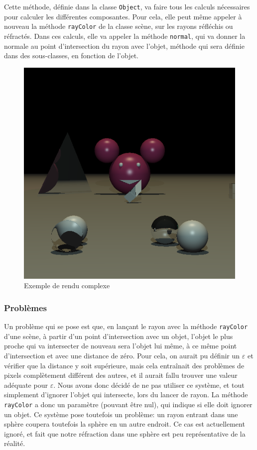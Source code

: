 \documentclass[a4paper]{article}
\begin{document}
    Cette méthode, définie dans la classe \verb+Object+, va faire tous les
    calculs nécessaires pour calculer les différentes composantes. Pour cela,
    elle peut même appeler à nouveau la méthode \verb+rayColor+ de la classe
    scène, sur les rayons réfléchis ou réfractés.
    Dans ces calculs, elle va appeler la méthode \verb+normal+, qui va donner
    la normale au point d'intersection du rayon avec l'objet, méthode qui sera
    définie dans des sous-classes, en fonction de l'objet.

    \begin{figure}[p]
      \includegraphics[width=\textwidth]{livrables/tests/raytracer/complet.png}
      \caption{Exemple de rendu complexe}
    \end{figure}

    \subsubsection{Problèmes}

    Un problème qui se pose est que, en lançant le rayon avec la méthode \verb+rayColor+ d'une scène,
    à partir d'un point d'intersection avec un objet, l'objet le plus proche qui va intersecter de nouveau
    sera l'objet lui même, à ce même point d'intersection et avec une distance de zéro.
    Pour cela, on aurait pu définir un $\varepsilon$ et vérifier que la distance y soit supérieure, mais
    cela entraînait des problèmes de pixels complètement différent des autres, et il aurait fallu trouver
    une valeur adéquate pour $\varepsilon$. Nous avons donc décidé de ne pas utiliser ce système, et tout
    simplement d'ignorer l'objet qui intersecte, lors du lancer de rayon.
    La méthode \verb+rayColor+ a donc un paramètre (pouvant être nul), qui indique si elle doit ignorer un objet.
    Ce système pose toutefois un problème: un rayon entrant dans une sphère coupera toutefois la sphère en un autre
    endroit. Ce cas est actuellement ignoré, et fait que notre réfraction dans une sphère est peu représentative de la réalité.
\end{document}

